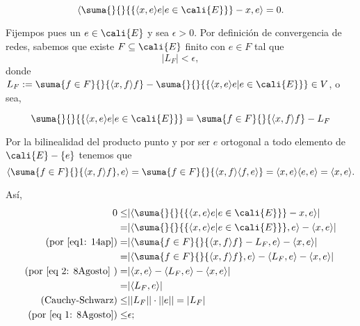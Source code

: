 \begin{itemize}
\begin{equation}
\label{eq2: 14ap}
\langle \suma{}{}{\{ \langle x,e \rangle e | e \in \cali{E} \}} -x, e \rangle
= 0.
\end{equation}

Fijempos pues un $e \in \cali{E}$ y sea
$\epsilon >0$.
Por definición de convergencia de redes, sabemos que
existe $F \subseteq \cali{E}$ finito con $e \in F$
tal que
\begin{equation} \label{eq 1: 8Agosto}
|L_{F}| < \epsilon,
\end{equation}
donde $L_{F}:= \suma{f \in F}{}{ \langle x,f \rangle f } - 
\suma{}{}{\{ \langle x,e \rangle e| e \in \cali{E} \}} \in V$, o sea,

\begin{equation}
\label{eq1: 14ap}
\suma{}{}{\{ \langle x,e \rangle e| e \in \cali{E} \}}
= \suma{f \in F}{}{ \langle x,f \rangle f } - L_{F}
\end{equation}

Por la bilinealidad del producto punto y por
ser $e$ ortogonal a todo elemento de $\cali{E}-\{ e \}$
tenemos que
\begin{equation} \label{eq 2: 8Agosto}
\langle \suma{f \in F}{}{\langle x,f \rangle f}, e \rangle = \suma{f \in F}{}{
\langle x,f \rangle \langle f,e \rangle}
= \langle x,e \rangle \langle e,e \rangle =
\langle x,e \rangle.
\end{equation}

Así,
\begin{align*}
0 \leq & | \langle \suma{}{}{\{ \langle x,e \rangle e | e \in \cali{E} \}} -x, e \rangle | \\
= &
| \langle \suma{}{}{\{ \langle x,e \rangle e | e \in \cali{E} \}}, e \rangle - 
\langle x, e \rangle| \\
(\text{por } \eqref{eq1: 14ap}) = & 
| \langle 
\suma{f \in F}{}{ \langle x,f \rangle f  } - L_{F}, e
\rangle - 
\langle x, e \rangle | \\ 
= & 
| \langle 
\suma{f \in F}{}{ \langle x,f \rangle f  }, e \rangle  
- \langle L_{F}, e \rangle - \langle x, e \rangle | \\
(\text{por \eqref{eq 2: 8Agosto} }) = & 
|
\langle x, e \rangle
- \langle L_{F}, e \rangle - \langle x, e \rangle |  \\
= & | \langle L_{F}, e \rangle | \\
(\text{Cauchy-Schwarz}) \leq & ||L_{F}|| \cdot ||e|| = |L_{F} | \\
(\text{por \eqref{eq 1: 8Agosto}}) \leq  &  \epsilon;
\end{align*}


\end{itemize}
